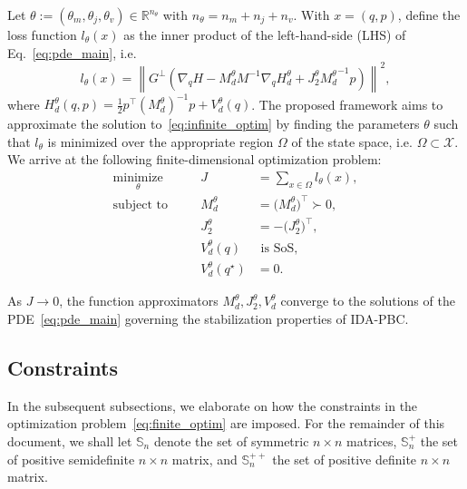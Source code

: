 Let $\theta := (\theta_m, \theta_j, \theta_v) \in \mathbb{R}^{n_\theta}$ with
$n_\theta = n_m + n_j + n_v$.
%
With $x = (q, p)$, define the loss function $l_\theta(x)$ as the
inner product of the left-hand-side (LHS) of Eq.~\eqref{eq:pde_main}, i.e.
%
\begin{equation}
    l_\theta(x) = \left\| G^\perp \left( \nabla_qH - M_d^\theta M^{-1} \nabla_q H_d^\theta + J_2^\theta {M_d^\theta}^{-1}p \right) \right\|^2,
    \label{eq:loss_nn}
\end{equation}
%
where $H_d^\theta(q,p) = \frac{1}{2} p^\top \left(M_d^\theta\right)^{-1} p +
V_d^\theta(q)$.
%
The proposed framework aims to approximate the solution
to~\eqref{eq:infinite_optim} by finding the parameters $\theta$ such that
$l_\theta$ is minimized over the appropriate region $\Omega$ of the state space,
i.e. $\Omega \subset \mathcal{X}$. We arrive at the following finite-dimensional
optimization problem:
%
\begin{equation}
    \begin{aligned}
        \underset{\theta }{\textrm{minimize}} 
        &&\quad J &= \sum_{x \in \Omega} l_\theta (x) , \\
        \textrm{subject to} 
        &&\quad M_d^\theta &= \big( M_d^\theta \big)^\top \succ 0, \\
        &&\quad J_2^\theta &= -\big( J_2^\theta \big)^\top, \\
        &&\quad V_d^\theta (q) &\textrm{ is SoS}, \\
        &&\quad V_d^\theta (q^\star) &= 0.
    \end{aligned}    
    \label{eq:finite_optim}
\end{equation}

As $J \rightarrow 0$, the function approximators $M_d^\theta, J_2^\theta,
V_d^\theta$ converge to the solutions of the PDE~\eqref{eq:pde_main} governing
the stabilization properties of IDA-PBC.



\subsection{Constraints}
\label{ssec:pinn}

In the subsequent subsections, we elaborate on how the constraints
in the optimization problem~\eqref{eq:finite_optim} are imposed. 
%
For the remainder of this document, we shall let $\mathbb{S}_n$ denote the set
of symmetric $n \times n$ matrices, $\mathbb{S}^{+}_n$ the set of positive
semidefinite $n \times n$ matrix, and $\mathbb{S}^{++}_n$ the set of positive
definite $n \times n$ matrix.

